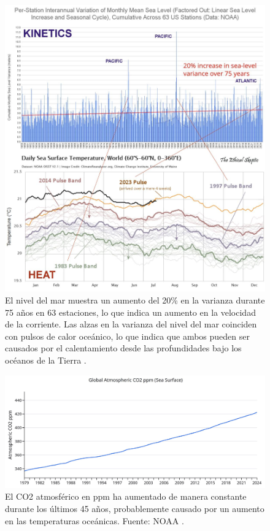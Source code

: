 \documentclass[10pt,twocolumn,letterpaper]{article}
\begin{document}
\begin{figure}[t]
\begin{center}

\includegraphics[width=1\textwidth]{sealevel.jpeg}
\end{center}
   \caption{El nivel del mar muestra un aumento del 20\% en la varianza durante 75 años en 63 estaciones, lo que indica un aumento en la velocidad de la corriente. Las alzas en la varianza del nivel del mar coinciden con pulsos de calor oceánico, lo que indica que ambos pueden ser causados por el calentamiento desde las profundidades bajo los océanos de la Tierra \cite{2,129}.}
\label{fig:22}
\end{figure}

\begin{figure}[t]
\begin{center}
\includegraphics[width=1\textwidth]{co2.jpg}
\end{center}
   \caption{El CO2 atmosférico en ppm ha aumentado de manera constante durante los últimos 45 años, probablemente causado por un aumento en las temperaturas oceánicas. Fuente: NOAA \cite{148,129}.}
\label{fig:23}
\end{figure}
\end{document}

